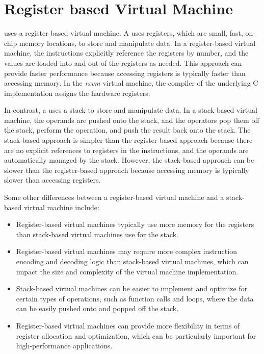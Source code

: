\section{Register based Virtual Machine}
\crexx{} uses a register based virtual machine.
A  uses registers, which are small, fast, on-chip memory locations, to store and manipulate data. In a register-based virtual machine, the instructions explicitly reference the registers by number, and the values are loaded into and out of the registers as needed. This approach can provide faster performance because accessing registers is typically faster than accessing memory. In the \emph{rxvm} virtual machine, the compiler of the underlying C implementation assigns the hardware registers.

In contrast, a  uses a stack to store and manipulate data. In a stack-based virtual machine, the operands are pushed onto the stack, and the operators pop them off the stack, perform the operation, and push the result back onto the stack. The stack-based approach is simpler than the register-based approach because there are no explicit references to registers in the instructions, and the operands are automatically managed by the stack. However, the stack-based approach can be slower than the register-based approach because accessing memory is typically slower than accessing registers.

Some other differences between a register-based virtual machine and a stack-based virtual machine include:
\begin{itemize}
\item Register-based virtual machines typically use more memory for the registers than stack-based virtual machines use for the stack.
\item Register-based virtual machines may require more complex instruction encoding and decoding logic than stack-based virtual machines, which can impact the size and complexity of the virtual machine implementation.
\item Stack-based virtual machines can be easier to implement and optimize for certain types of operations, such as function calls and loops, where the data can be easily pushed onto and popped off the stack.
\item Register-based virtual machines can provide more flexibility in terms of register allocation and optimization, which can be particularly important for high-performance applications.
\end{itemize}

